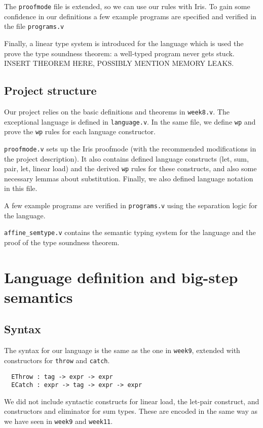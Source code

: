 \documentclass{article}
\begin{document}
The \texttt{proofmode} file is extended, so we can use our rules with Iris. To gain some confidence in our definitions a few example programs are specified and verified in the file \texttt{programs.v}

Finally, a linear type system is introduced for the language which is used the prove the type soundness theorem: a well-typed program never gets stuck. INSERT THEOREM HERE, POSSIBLY MENTION MEMORY LEAKS.

\subsection{Project structure}

Our project relies on the basic definitions and theorems in \texttt{week8.v}. The exceptional language is defined in \texttt{language.v}. In the same file, we define \texttt{wp} and prove the \texttt{wp} rules for each language constructor.

\texttt{proofmode.v} sets up the Iris proofmode (with the recommended modifications in the project description). It also contains defined language constructs (let, sum, pair, let, linear load) and the derived \texttt{wp} rules for these constructs, and also some necessary lemmas about substitution. Finally, we also defined language notation in this file.

A few example programs are verified in \texttt{programs.v} using the separation logic for the language.

\texttt{affine\_semtype.v} contains the semantic typing system for the language and the proof of the type soundness theorem.

\section{Language definition and big-step semantics}

\subsection{Syntax}

The syntax for our language is the same as the one in \texttt{week9}, extended with constructors for \texttt{throw} and \texttt{catch}.
\begin{lstlisting}
  EThrow : tag -> expr -> expr
  ECatch : expr -> tag -> expr -> expr
\end{lstlisting}
We did not include syntactic constructs for linear load, the let-pair construct, and constructors and eliminator for sum types.
These are encoded in the same way as we have seen in \texttt{week9} and \texttt{week11}.
\end{document}
